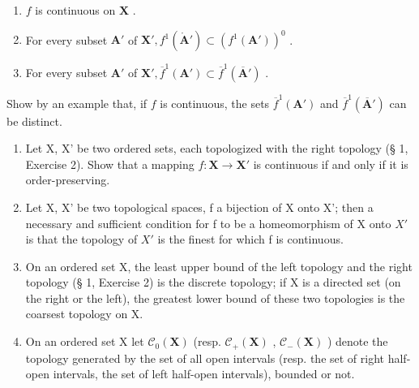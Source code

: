\begin{enumerate}
\def\labelenumi{\alph{enumi})}
\item
  \(f\) is continuous on \(\mathbf{X}\) .
\item
  For every subset \(\mathbf{A}'\) of \(\mathbf{X}', f^1 (\mathring{\mathbf{A}}') \subset (f^1 (\mathbf{A}'))^0\) .
\item
  For every subset \(\mathbf{A}'\) of \(\mathbf{X}', \overline{f}^1 (\mathbf{A}') \subset \overline{f}^1 (\overline{\mathbf{A}}')\) .
\end{enumerate}

Show by an example that, if \(f\) is continuous, the sets \(\overline{f}^1 (\mathbf{A}')\) and \(\overline{f}^1 (\overline{\mathbf{A}}')\) can be distinct.

\begin{enumerate}
\def\labelenumi{\arabic{enumi})}
\setcounter{enumi}{1}
\item
  Let X, X' be two ordered sets, each topologized with the right topology (§ 1, Exercise 2). Show that a mapping \(f: \mathbf{X} \to \mathbf{X}'\) is continuous if and only if it is order-preserving.
\item
  Let X, X' be two topological spaces, f a bijection of X onto X'; then a necessary and sufficient condition for f to be a homeomorphism of X onto \(X'\) is that the topology of \(X'\) is the finest for which f is continuous.
\item
  On an ordered set X, the least upper bound of the left topology and the right topology (§ 1, Exercise 2) is the discrete topology; if X is a directed set (on the right or the left), the greatest lower bound of these two topologies is the coarsest topology on X.
\item
  On an ordered set X let \(\mathcal{C}_{0}(\mathbf{X})\) (resp. \(\mathcal{C}_{+}(\mathbf{X})\) , \(\mathcal{C}_{-}(\mathbf{X})\) ) denote the topology generated by the set of all open intervals (resp. the set of right half-open intervals, the set of left half-open intervals), bounded or not.
\end{enumerate}


